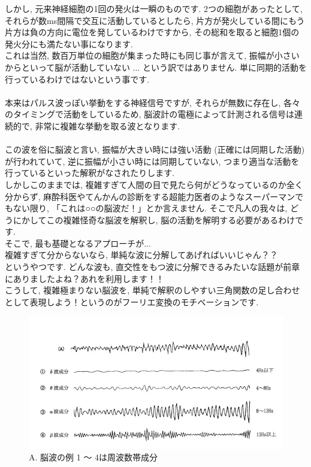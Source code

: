 \documentclass[11pt,a4paper,uplatex]{ujreport} 	%
\begin{document}
しかし, 元来神経細胞の1回の発火は一瞬のものです. 2つの細胞があったとして, それらが数ms間隔で交互に活動しているとしたら, 片方が発火している間にもう片方は負の方向に電位を発しているわけですから, その総和を取ると細胞1個の発火分にも満たない事になります. \\
これは当然, 数百万単位の細胞が集まった時にも同じ事が言えて, 振幅が小さいからといって脳が活動していない ... という訳ではありません. 単に同期的活動を行っているわけではないという事です.\\
\\
本来はパルス波っぽい挙動をする神経信号ですが, それらが無数に存在し, 各々のタイミングで活動をしているため, 脳波計の電極によって計測される信号は連続的で, 非常に複雑な挙動を取る波となります. \\
\\
この波を俗に脳波と言い, 振幅が大きい時には強い活動 (正確には同期した活動) が行われていて, 逆に振幅が小さい時には同期していない, つまり適当な活動を行っているといった解釈がなされたりします. \\
しかしこのままでは, 複雑すぎて人間の目で見たら何がどうなっているのか全く分からず, 麻酔科医やてんかんの診断をする超能力医者のようなスーパーマンでもない限り, 「これは○○の脳波だ！」とか言えません. そこで凡人の我々は, どうにかしてこの複雑怪奇な脳波を解釈し, 脳の活動を解明する必要があるわけです.\\

そこで, 最も基礎となるアプローチが...\\
複雑すぎて分からないなら, 単純な波に分解してあげればいいじゃん？？\\ 
というやつです. どんな波も, 直交性をもつ波に分解できるみたいな話題が前章にありましたよね？あれを利用します！！
\\
こうして, 複雑極まりない脳波を, 単純で解釈のしやすい三角関数の足し合わせとして表現しよう！というのがフーリエ変換のモチベーションです.\\

\begin{figure}[H]
\label{im:eeg}
  \centering
  \includegraphics[width=120mm,bb=0 0 600 313]{figures/eeg.jpg}
  \caption{A. 脳波の例 1 ～ 4は周波数帯成分}
\end{figure}
\end{document}
